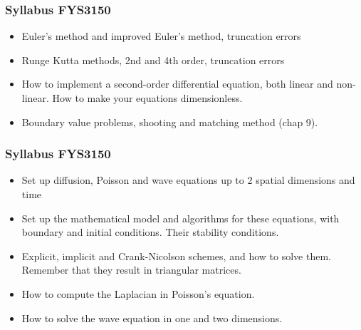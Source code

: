 \documentclass{beamer}
\newenvironment{block_mdfboxadmon}[1][]{\begin{block}{#1}}{\end{block}}
\begin{document}
\begin{frame}
\frametitle{Syllabus FYS3150}

\begin{block_mdfboxadmon}
\begin{itemize}
  \item Euler's method and improved Euler's method, truncation errors

  \item Runge Kutta methods, 2nd and 4th order, truncation errors

  \item How to implement a second-order differential equation, both linear and non-linear. How to make your equations dimensionless.

  \item Boundary value problems, shooting and matching method (chap 9).
\end{itemize}

\noindent
\end{block_mdfboxadmon}
\end{frame}

\begin{frame}
\frametitle{Syllabus FYS3150}

\begin{block_mdfboxadmon}
\begin{itemize}
  \item Set up diffusion, Poisson and wave equations up to 2 spatial dimensions and time

  \item Set up the mathematical model and algorithms for these equations, with boundary and initial conditions. Their stability conditions.

  \item Explicit, implicit and Crank-Nicolson schemes, and how to solve them. Remember that they result in triangular matrices.

  \item How to compute the Laplacian in Poisson's equation.

  \item How to solve the wave equation in one and two dimensions.
\end{itemize}

\noindent
\end{block_mdfboxadmon}
\end{frame}
\end{document}
